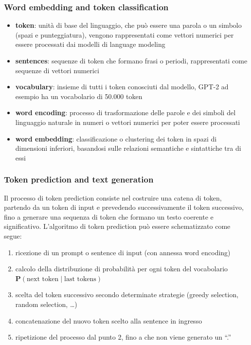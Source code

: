 \subsubsection*{Word embedding and token classification}
\begin{itemize}
	\item \textbf{token}: unità di base del linguaggio, che può essere una parola o un simbolo (spazi e punteggiatura), vengono
	rappresentati come vettori numerici per essere processati dai modelli di language modeling
	\item \textbf{sentences}: sequenze di token che formano frasi o periodi, rappresentati come sequenze di vettori numerici
	\item \textbf{vocabulary}: insieme di tutti i token conosciuti dal modello, GPT-2 ad esempio ha un vocabolario di 50.000 token
	\item \textbf{word encoding}: processo di trasformazione delle parole e dei simboli del linguaggio naturale in numeri
	o vettori numerici per poter essere processati
	\item \textbf{word embedding}: classificazione o clustering dei token in spazi di dimensioni inferiori, basandosi sulle
	relazioni semantiche e sintattiche tra di essi
\end{itemize}

\subsubsection*{Token prediction and text generation}
Il processo di token prediction consiste nel costruire una catena di token, partendo da un token di input e prevedendo
successivamente il token successivo, fino a generare una sequenza di token che formano un testo coerente e significativo.
L'algoritmo di token prediction può essere schematizzato come segue:
\begin{enumerate}
	\item ricezione di un prompt o sentence di input (con annessa word encoding)
	\item calcolo della distribuzione di probabilità per ogni token del vocabolario \(\textbf{P}(\text{next token} \mid \text{last tokens})\)
	\item scelta del token successivo secondo determinate strategie (greedy selection, random selection, \dots)
	\item concatenazione del nuovo token scelto alla sentence in ingresso
	\item ripetizione del processo dal punto 2, fino a che non viene generato un ``.''
\end{enumerate}

